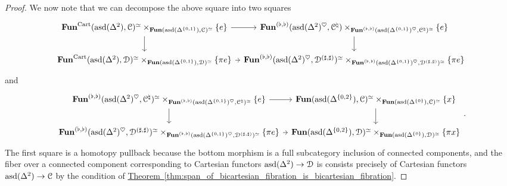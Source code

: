 \documentclass[main.tex]{subfiles}
\begin{document}
\begin{proof}
  We now note that we can decompose the above square into two squares
  \begin{equation*}
    \begin{tikzcd}[column sep=tiny]
      \Fun^{\Cart}(\asd(\Delta^{2}), \category{C})^{\simeq} \times_{\Fun(\asd(\Delta^{\{0, 1\}}), \category{C})^{\simeq}} \{e\}
      \arrow[r]
      \arrow[d]
      & \Fun^{(\flat, \flat)}(\asd(\Delta^{2})^{\heartsuit}, \category{C}^{\natural}) \times_{\Fun^{(\flat, \flat)}(\asd(\Delta^{\{0, 1\}})^{\heartsuit}, \category{C}^{\natural})^{\simeq}} \{e\}
      \arrow[d]
      \\
      \Fun^{\Cart}(\asd(\Delta^{2}), \category{D})^{\simeq} \times_{\Fun(\asd(\Delta^{\{0, 1\}}), \category{D})^{\simeq}} \{\pi e\}
      \arrow[r]
      & \Fun^{(\flat, \flat)}(\asd(\Delta^{2})^{\heartsuit}, \category{D}^{(\sharp, \sharp)})^{\simeq} \times_{\Fun^{(\flat, \flat)}(\asd(\Delta^{\{0, 1\}})^{\heartsuit}, \category{D}^{(\sharp, \sharp)})^{\simeq}} \{\pi e\}
    \end{tikzcd}
  \end{equation*}
  and
  \begin{equation*}
    \begin{tikzcd}[column sep=tiny]
      \Fun^{(\flat, \flat)}(\asd(\Delta^{2})^{\heartsuit}, \category{C}^{\natural})^{\simeq} \times_{\Fun^{(\flat, \flat)}(\asd(\Delta^{\{0, 1\}})^{\heartsuit}, \category{C}^{\natural})^{\simeq}} \{e\}
      \arrow[r]
      \arrow[d]
      & \Fun(\asd(\Delta^{\{0, 2\}}), \category{C})^{\simeq} \times_{\Fun(\asd(\Delta^{\{0\}}), \category{C})^{\simeq}} \{x\}
      \arrow[d]
      \\
      \Fun^{(\flat, \flat)}(\asd(\Delta^{2})^{\heartsuit}, \category{D}^{(\sharp, \sharp)})^{\simeq} \times_{\Fun^{(\flat, \flat)}(\asd(\Delta^{\{0, 1\}})^{\heartsuit}, \category{D}^{(\sharp, \sharp)})^{\simeq}} \{\pi e\}
      \arrow[r]
      & \Fun(\asd(\Delta^{\{0, 2\}}), \category{D})^{\simeq} \times_{\Fun(\asd(\Delta^{\{0\}}), \category{D})^{\simeq}} \{\pi x\}
    \end{tikzcd}.
  \end{equation*}
  The first square is a homotopy pullback because the bottom morphism is a full subcategory inclusion of connected components, and the fiber over a connected component corresponding to Cartesian functors $\mathrm{asd}(\Delta^{2}) \to \mathcal{D}$ is consists precisely of Cartesian functors $\mathrm{asd}(\Delta^{2}) \to \mathcal{C}$ by the condition of \hyperref[thm:span_of_bicartesian_fibration_is_bicartesian_fibration]{Theorem~\ref*{thm:span_of_bicartesian_fibration_is_bicartesian_fibration}}.


\end{proof}
\end{document}
